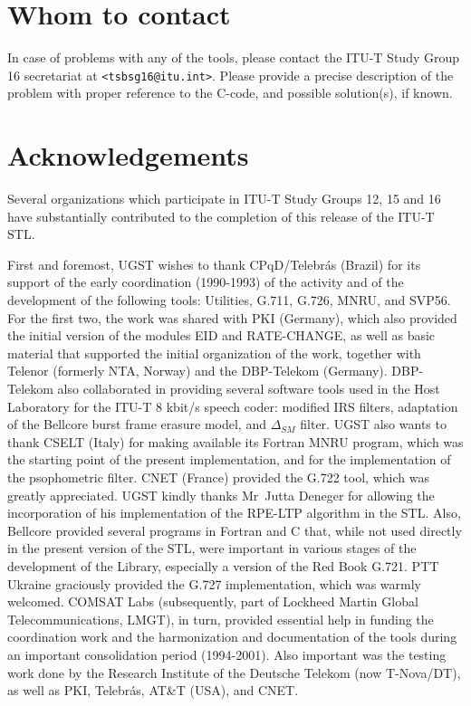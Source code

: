 \section{Whom to contact}

In case of problems with any of the tools, please contact the ITU-T
Study Group 16 secretariat at {\tt <tsbsg16@itu.int>}. Please provide
a precise description of the problem with proper reference to the
C-code, and possible solution(s), if known.

\section{Acknowledgements}

Several organizations which participate in ITU-T Study Groups 12, 15
and 16 have substantially contributed to the completion of this
release of the ITU-T STL.

First and foremost, UGST wishes to thank CPqD/Telebr\'as (Brazil)
for its support of the early coordination (1990-1993) of the
activity and of the development of the following tools: Utilities,
G.711, G.726, MNRU, and SVP56. For the first two, the work was
shared with PKI (Germany), which also provided the initial version
of the modules EID and RATE-CHANGE, as well as basic material that
supported the initial organization of the work, together with
Telenor (formerly NTA, Norway) and the DBP-Telekom (Germany).
DBP-Telekom also collaborated in providing several software tools
used in the Host Laboratory for the ITU-T 8 kbit/s speech coder:
modified IRS filters, adaptation of the Bellcore burst frame erasure
model, and $\Delta_{SM}$ filter. UGST also wants to thank CSELT
(Italy) for making available its Fortran MNRU program, which was the
starting point of the present implementation, and for the
implementation of the psophometric filter.
%
CNET (France) provided the G.722 tool, which was greatly
appreciated. UGST kindly thanks Mr~Jutta Deneger for allowing the
incorporation of his implementation of the RPE-LTP algorithm in the
STL. Also, Bellcore provided several programs in Fortran and C that,
while not used directly in the present version of the STL, were
important in various stages of the development of the Library,
especially a version of the Red Book G.721.
%
PTT Ukraine graciously provided the G.727 implementation, which was
warmly welcomed. 
%
COMSAT Labs (subsequently, part of Lockheed Martin Global
Telecommunications, LMGT), in turn, provided essential help in funding
the coordination work and the harmonization and
documentation of the tools during an important consolidation period (1994-2001). 
Also important was the testing work done by the Research Institute of
the Deutsche Telekom (now T-Nova/DT), as well as PKI, Telebr\'{a}s,
AT\&T (USA), and CNET.

